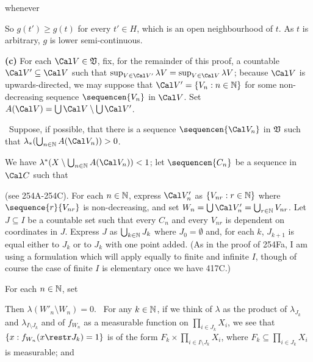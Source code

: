 {

\noindent whenever


\noindent So $g(t')\ge g(t)$ for every $t'\in H$, which is an open
neighbourhood of $t$.   As $t$ is arbitrary, $g$ is lower
semi-continuous.\ \Qed

\medskip

{\bf (c)} For each $\Cal V\in\frak V$, fix, for the remainder of this
proof, a countable $\Cal V'\subseteq\Cal V$ such that
$\sup_{V\in\Cal V'}\lambda V=\sup_{V\in\Cal V}\lambda V$;  because
$\Cal V$ is
upwards-directed, we may suppose that $\Cal V'=\{V_n:n\in\Bbb N\}$ for
some non-decreasing sequence $\sequencen{V_n}$ in $\Cal V$.   Set
$A(\Cal V)=\bigcup\Cal V\setminus\bigcup\Cal V'$.

\Quer\ Suppose, if possible, that there is a sequence
$\sequencen{\Cal V_n}$ in $\frak V$ such that
$\lambda_*(\bigcup_{n\in\Bbb N}A(\Cal V_n))>0$.

\medskip

 We have
$\lambda^*(X\setminus\bigcup_{n\in\Bbb N}A(\Cal V_n))<1$;  let
$\sequencen{C_n}$ be a sequence in $\Cal C$ such that


\noindent (see 254A-254C).   For each $n\in\Bbb N$, express $\Cal V'_n$
as $\{V_{nr}:r\in\Bbb N\}$ where $\sequence{r}{V_{nr}}$ is
non-decreasing,
and set $W_n=\bigcup\Cal V'_n=\bigcup_{r\in\Bbb N}V_{nr}$.   Let
$J\subseteq I$ be a
countable set such that every $C_n$ and every $V_{nr}$ is dependent on
coordinates in $J$.   Express $J$ as $\bigcup_{k\in\Bbb N}J_k$ where
$J_0=\emptyset$ and, for each $k$, $J_{k+1}$ is equal either to $J_k$ or
to $J_k$ with one point added.   (As in the proof of 254Fa, I am using a
formulation which will apply equally to finite and infinite $I$, though
of course the case of finite $I$ is elementary once we have 417C.)

\medskip

 For each $n\in\Bbb N$, set


\noindent Then $\lambda(W'_n\setminus W_n)=0$.   \Prf\ For any
$k\in\Bbb N$, if we think of $\lambda$ as the product of $\lambda_{J_k}$
and $\lambda_{I\setminus J_k}$ and of $f_{W_n}$ as a measurable function
on $\prod_{i\in J_k}X_i$, we see that $\{x:f_{W_n}(x\restr J_k)=1\}$ is
of the form $F_k\times\prod_{i\in I\setminus J_k}X_i$, where
$F_k\subseteq\prod_{i\in J_k}X_i$ is measurable;   and

}
